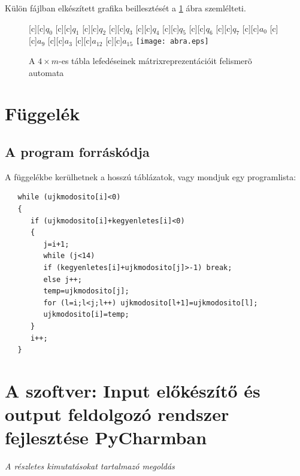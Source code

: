\documentclass[12pt]{report}
\theoremstyle{definition}
\begin{document}
\newpage

Külön fájlban elkészített grafika beillesztését a \ref{abra-automata} ábra szemlélteti.
\begin{figure}[h]
\centering
[c][c]{$q_0$}
[c][c]{$q_1$}
[c][c]{$q_2$}
[c][c]{$q_3$}
[c][c]{$q_4$}
[c][c]{$q_5$}
[c][c]{$q_6$}
[c][c]{$q_7$}
[c][c]{$a_{0}$}
[c][c]{$a_{9}$}
[c][c]{$a_{3}$}
[c][c]{$a_{12}$}
[c][c]{$a_{15}$}
\texttt{[image: abra.eps]}
\caption{\label{abra-automata} A $4\times m$-es tábla lefedéseinek mátrixreprezentációit felismerõ automata}
\end{figure}


\chapter{Függelék}

\section{A program forráskódja}
A függelékbe kerülhetnek a hosszú táblázatok, vagy mondjuk egy programlista:
\begin{verbatim}
   while (ujkmodosito[i]<0)
   {
      if (ujkmodosito[i]+kegyenletes[i]<0)
      {
         j=i+1;
         while (j<14)
         if (kegyenletes[i]+ujkmodosito[j]>-1) break;
         else j++;
         temp=ujkmodosito[j];
         for (l=i;l<j;l++) ujkmodosito[l+1]=ujkmodosito[l];
         ujkmodosito[i]=temp;
      }
      i++;
   }
\end{verbatim}

\newcommand{\chapterwithdesc}[2]{%
  \chapter{#1}%
  \vspace{-1ex}%
  {\large\itshape #2\par}%
  \vspace{2ex}%
}
\chapterwithdesc
  {A szoftver: Input előkészítő és output feldolgozó rendszer fejlesztése PyCharmban}
  {A részletes kimutatásokat tartalmazó megoldás}
\label{chap:src/Framework}
\end{document}
